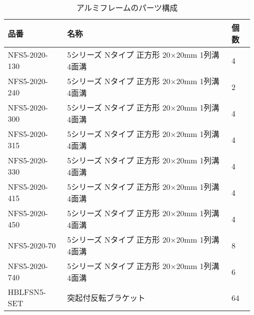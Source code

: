 \documentclass[../../main.tex]{subfiles}
\numberwithin{equation}{section}
\numberwithin{table}{section}
\numberwithin{figure}{section}
\begin{document}
  \begin{table}[H]
    \centering
    \caption{アルミフレームのパーツ構成}\label{table:preparation_al_frame}
    \begin{tabular}{ll|l}
      品番 & 名称 & 個数 \\\hline\hline
      NFS5-2020-130 & 5シリーズ Nタイプ 正方形 20×20mm 1列溝 4面溝 & 4  \\
      NFS5-2020-240 & 5シリーズ Nタイプ 正方形 20×20mm 1列溝 4面溝 & 2  \\
      NFS5-2020-300 & 5シリーズ Nタイプ 正方形 20×20mm 1列溝 4面溝 & 4  \\
      NFS5-2020-315 & 5シリーズ Nタイプ 正方形 20×20mm 1列溝 4面溝 & 4  \\
      NFS5-2020-330 & 5シリーズ Nタイプ 正方形 20×20mm 1列溝 4面溝 & 4  \\
      NFS5-2020-415 & 5シリーズ Nタイプ 正方形 20×20mm 1列溝 4面溝 & 4  \\
      NFS5-2020-450 & 5シリーズ Nタイプ 正方形 20×20mm 1列溝 4面溝 & 4  \\
      NFS5-2020-70  & 5シリーズ Nタイプ 正方形 20×20mm 1列溝 4面溝 & 8  \\
      NFS5-2020-740 & 5シリーズ Nタイプ 正方形 20×20mm 1列溝 4面溝 & 6  \\
      HBLFSN5-SET   & 突起付反転ブラケット                     & 64
    \end{tabular}
  \end{table}


\end{document}
